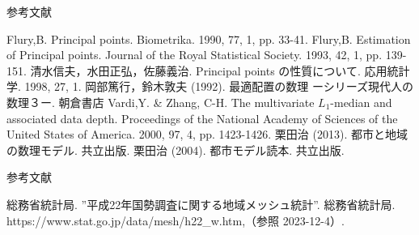 \documentclass[unicode,11pt]{beamer}
\begin{document}
\begin{frame}{参考文献}
    \begin{thebibliography}{99}
        Flury,B. Principal points. Biometrika. 1990, 77, 1, pp. 33-41.
        Flury,B. Estimation of Principal points. Journal of the Royal  Statistical Society. 1993, 42, 1, pp. 139-151.
        清水信夫，水田正弘，佐藤義治. Principal points の性質について. 応用統計学. 1998, 27, 1.
        岡部篤行，鈴木敦夫 (1992). 最適配置の数理 ーシリーズ現代人の数理３ー. 朝倉書店
        Vardi,Y. \& Zhang, C-H. The multivariate $L_1$-median and associated data depth. Proceedings of the National Academy of Sciences of the United States of America. 2000, 97, 4, pp. 1423-1426.
        栗田治 (2013). 都市と地域の数理モデル. 共立出版.
        栗田治 (2004). 都市モデル読本. 共立出版.
    \end{thebibliography}
\end{frame}

\begin{frame}{参考文献}
    \begin{thebibliography}{99}
        総務省統計局. ”平成22年国勢調査に関する地域メッシュ統計”. 総務省統計局. https://www.stat.go.jp/data/mesh/h22\_w.htm,（参照 2023-12-4）.
    \end{thebibliography}
\end{frame}
\end{document}
